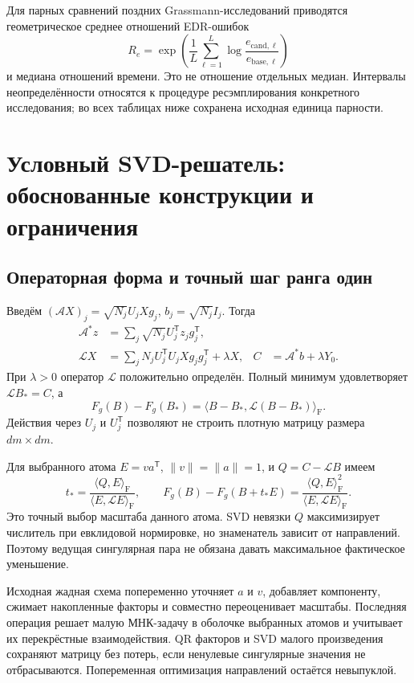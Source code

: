\documentclass[11pt,a4paper]{article}
\numberwithin{equation}{section}
\newcommand{\T}{^{\mathsf T}}
\newcommand{\ip}[2]{\langle #1,#2\rangle_{\mathrm F}}
\begin{document}
Для парных сравнений поздних Grassmann-исследований приводятся
геометрическое среднее отношений EDR-ошибок
\[
 R_e=\exp\left(\frac1L\sum_{\ell=1}^L
         \log\frac{e_{\mathrm{cand},\ell}}{e_{\mathrm{base},\ell}}\right)
\]
и медиана отношений времени. Это не отношение отдельных медиан.
Интервалы неопределённости относятся к процедуре ресэмплирования
конкретного исследования; во всех таблицах ниже сохранена исходная
единица парности.\cite{metricdef,relative,combined,lowrank}

\section{Условный SVD-решатель: обоснованные конструкции и ограничения}
\label{sec:fixedsvd}

\subsection{Операторная форма и точный шаг ранга один}

Введём $(\mathcal AX)_j=\sqrt{N_j}U_jXg_j$,
$b_j=\sqrt{N_j}I_j$. Тогда
\begin{align}
 \mathcal A^*z&=\sum_j\sqrt{N_j}U_j\T z_jg_j\T,\nonumber\\
 \mathcal LX&=\sum_jN_jU_j\T U_jXg_jg_j\T+\lambda X,
 &C&=\mathcal A^*b+\lambda Y_0.\label{eq:operator}
\end{align}
При $\lambda>0$ оператор $\mathcal L$ положительно определён.
Полный минимум удовлетворяет $\mathcal LB_*=C$, а
\begin{equation}\label{eq:energy}
 F_g(B)-F_g(B_*)=\ip{B-B_*}{\mathcal L(B-B_*)}.
\end{equation}
Действия через $U_j$ и $U_j\T$ позволяют не строить плотную
матрицу размера $dm\times dm$.

Для выбранного атома $E=va\T$, $\|v\|=\|a\|=1$,
и $Q=C-\mathcal LB$ имеем
\begin{equation}\label{eq:atom}
 t_* =\frac{\ip{Q}{E}}{\ip{E}{\mathcal LE}},\qquad
 F_g(B)-F_g(B+t_*E)=\frac{\ip{Q}{E}^2}{\ip{E}{\mathcal LE}}.
\end{equation}
Это точный выбор масштаба данного атома. SVD невязки $Q$
максимизирует числитель при евклидовой нормировке, но знаменатель
зависит от направлений. Поэтому ведущая сингулярная пара не обязана
давать максимальное фактическое уменьшение.

Исходная жадная схема попеременно уточняет $a$ и $v$, добавляет
компоненту, сжимает накопленные факторы и совместно переоценивает
масштабы. Последняя операция решает малую МНК-задачу в оболочке
выбранных атомов и учитывает их перекрёстные взаимодействия.
QR факторов и SVD малого произведения сохраняют матрицу без потерь,
если ненулевые сингулярные значения не отбрасываются.
Попеременная оптимизация направлений остаётся невыпуклой.\cite{svd,algorithm}
\end{document}
